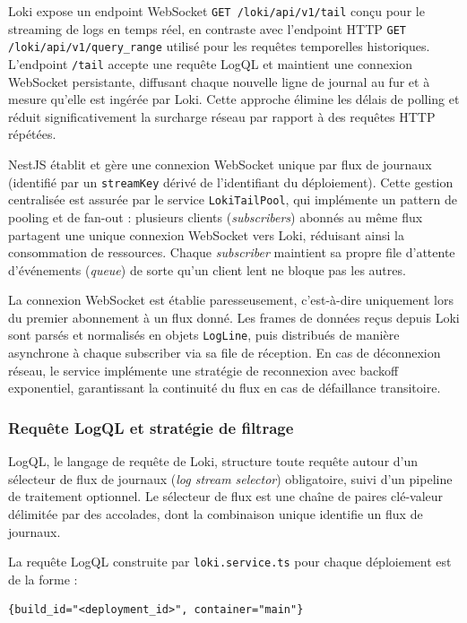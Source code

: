 Loki expose un endpoint WebSocket \texttt{GET /loki/api/v1/tail} conçu pour le streaming de logs en temps réel, en contraste avec l'endpoint HTTP \texttt{GET /loki/api/v1/query\_range} utilisé pour les requêtes temporelles historiques. L'endpoint \texttt{/tail} accepte une requête LogQL et maintient une connexion WebSocket persistante, diffusant chaque nouvelle ligne de journal au fur et à mesure qu'elle est ingérée par Loki. Cette approche élimine les délais de polling et réduit significativement la surcharge réseau par rapport à des requêtes HTTP répétées.

NestJS établit et gère une connexion WebSocket unique par flux de journaux (identifié par un \texttt{streamKey} dérivé de l'identifiant du déploiement). Cette gestion centralisée est assurée par le service \texttt{LokiTailPool}, qui implémente un pattern de pooling et de fan-out : plusieurs clients (\textit{subscribers}) abonnés au même flux partagent une unique connexion WebSocket vers Loki, réduisant ainsi la consommation de ressources. Chaque \textit{subscriber} maintient sa propre file d'attente d'événements (\textit{queue}) de sorte qu'un client lent ne bloque pas les autres.

La connexion WebSocket est établie paresseusement, c'est-à-dire uniquement lors du premier abonnement à un flux donné. Les frames de données reçus depuis Loki sont parsés et normalisés en objets \texttt{LogLine}, puis distribués de manière asynchrone à chaque subscriber via sa file de réception. En cas de déconnexion réseau, le service implémente une stratégie de reconnexion avec backoff exponentiel, garantissant la continuité du flux en cas de défaillance transitoire.

\subsubsection*{Requête LogQL et stratégie de filtrage}

LogQL, le langage de requête de Loki, structure toute requête autour d'un sélecteur de flux de journaux (\textit{log stream selector}) obligatoire, suivi d'un pipeline de traitement optionnel.  Le sélecteur de flux est une chaîne de paires clé-valeur délimitée par des accolades, dont la combinaison unique identifie un flux de journaux. 

La requête LogQL construite par \texttt{loki.service.ts} pour chaque déploiement est de la forme :

\begin{verbatim}
{build_id="<deployment_id>", container="main"}
\end{verbatim}

